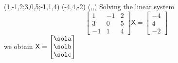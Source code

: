 \SOLVELINEARSYSTEM(1,-1,2;3,0,5;-1,1,4)%
                  (-4,4,-2)%
                  (\sola,\solb,\solc)
Solving the linear system
\[
\begin{bmatrix}
      1 & -1 & 2 \\ 3 & 0 & 5 \\ -1 & 1 & 4
     \end{bmatrix}\mathsf{X}=\begin{bmatrix}
      -4\\4\\-2
     \end{bmatrix}
\]
we obtain
$\mathsf{X}=\begin{bmatrix}
       \sola \\ \solb\\ \solc
     \end{bmatrix}$
